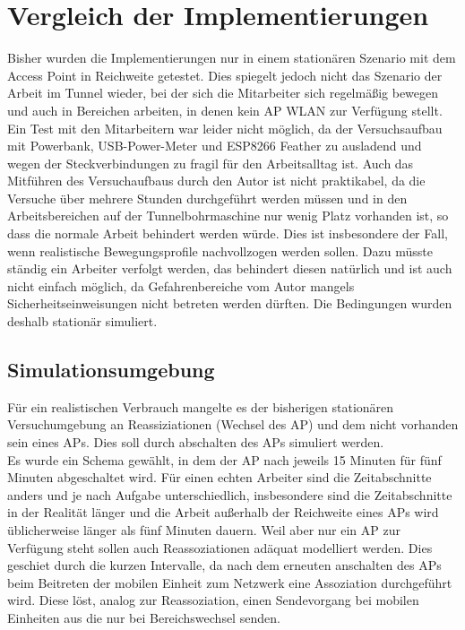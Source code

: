 \chapter{Vergleich der Implementierungen}
\label{ch:vergleich}
Bisher wurden die Implementierungen nur in einem stationären Szenario mit dem Access Point in Reichweite getestet. 
Dies spiegelt jedoch nicht das Szenario der Arbeit im Tunnel wieder, bei der sich die Mitarbeiter sich regelmäßig bewegen und auch in Bereichen arbeiten, in denen kein AP WLAN zur Verfügung stellt. \\
Ein Test mit den Mitarbeitern war leider nicht möglich, da der Versuchsaufbau mit Powerbank, USB-Power-Meter und ESP8266 Feather zu ausladend und wegen der Steckverbindungen zu fragil für den Arbeitsalltag ist.
Auch das Mitführen des Versuchaufbaus durch den Autor ist nicht praktikabel, da die Versuche über mehrere Stunden durchgeführt werden müssen und in den Arbeitsbereichen auf der Tunnelbohrmaschine nur wenig Platz vorhanden ist, so dass die normale Arbeit behindert werden würde.
Dies ist insbesondere der Fall, wenn realistische Bewegungsprofile nachvollzogen werden sollen. 
Dazu müsste ständig ein Arbeiter verfolgt werden, das behindert diesen natürlich und ist auch nicht einfach möglich, da Gefahrenbereiche vom Autor mangels Sicherheitseinweisungen nicht betreten werden dürften.
Die Bedingungen wurden deshalb stationär simuliert.

\section{Simulationsumgebung}
Für ein realistischen Verbrauch mangelte es der bisherigen stationären Versuchumgebung an Reassiziationen (Wechsel des AP) und dem nicht vorhanden sein eines APs.
Dies soll durch abschalten des APs simuliert werden. \\
Es wurde ein Schema gewählt, in dem der AP nach jeweils 15 Minuten für fünf Minuten abgeschaltet wird. 
Für einen echten Arbeiter sind die Zeitabschnitte anders und je nach Aufgabe unterschiedlich, insbesondere sind die Zeitabschnitte in der Realität länger und die Arbeit außerhalb der Reichweite eines APs wird üblicherweise länger als fünf Minuten dauern.
Weil aber nur ein AP zur Verfügung steht sollen auch Reassoziationen adäquat modelliert werden.
Dies geschiet durch die kurzen Intervalle, da nach dem erneuten anschalten des APs beim Beitreten der mobilen Einheit zum Netzwerk eine Assoziation durchgeführt wird. 
Diese löst, analog zur Reassoziation, einen Sendevorgang bei mobilen Einheiten aus die nur bei Bereichswechsel senden.

